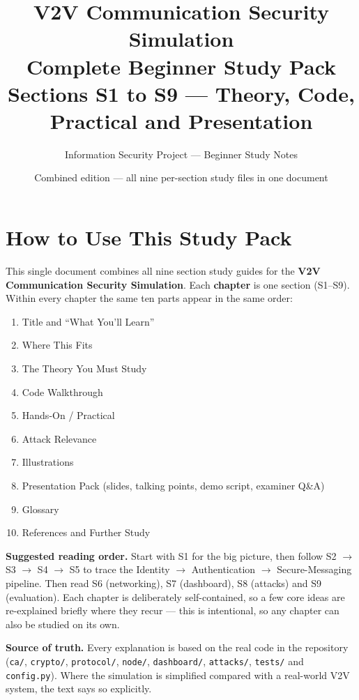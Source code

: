 \documentclass[11pt,a4paper]{report}
\title{\textbf{\Huge V2V Communication Security Simulation}\\[12pt]
       \Large Complete Beginner Study Pack\\[6pt]
       \large Sections S1 to S9 --- Theory, Code, Practical and Presentation}
\author{Information Security Project --- Beginner Study Notes}
\date{Combined edition --- all nine per-section study files in one document}
\begin{document}
\maketitle

\tableofcontents
\clearpage

\chapter*{How to Use This Study Pack}

This single document combines all nine section study guides for the
\textbf{V2V Communication Security Simulation}. Each \textbf{chapter} is one
section (S1--S9). Within every chapter the same ten parts appear in the same
order:
\begin{enumerate}
  \item Title and ``What You'll Learn''
  \item Where This Fits
  \item The Theory You Must Study
  \item Code Walkthrough
  \item Hands-On / Practical
  \item Attack Relevance
  \item Illustrations
  \item Presentation Pack (slides, talking points, demo script, examiner Q\&A)
  \item Glossary
  \item References and Further Study
\end{enumerate}

\medskip
\noindent\textbf{Suggested reading order.} Start with S1 for the big picture,
then follow S2 $\rightarrow$ S3 $\rightarrow$ S4 $\rightarrow$ S5 to trace the
Identity $\rightarrow$ Authentication $\rightarrow$ Secure-Messaging pipeline.
Then read S6 (networking), S7 (dashboard), S8 (attacks) and S9 (evaluation).
Each chapter is deliberately self-contained, so a few core ideas are
re-explained briefly where they recur --- this is intentional, so any chapter
can also be studied on its own.

\medskip
\noindent\textbf{Source of truth.} Every explanation is based on the real code
in the repository (\texttt{ca/}, \texttt{crypto/}, \texttt{protocol/},
\texttt{node/}, \texttt{dashboard/}, \texttt{attacks/}, \texttt{tests/} and
\texttt{config.py}). Where the simulation is simplified compared with a
real-world V2V system, the text says so explicitly.
\end{document}
